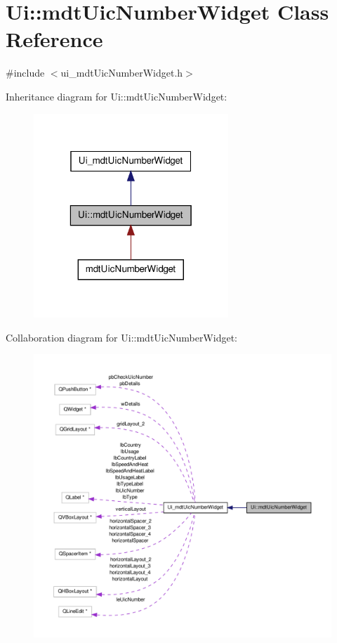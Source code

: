 \hypertarget{class_ui_1_1mdt_uic_number_widget}{\section{Ui\-:\-:mdt\-Uic\-Number\-Widget Class Reference}
\label{class_ui_1_1mdt_uic_number_widget}
}


{\ttfamily \#include $<$ui\-\_\-mdt\-Uic\-Number\-Widget.\-h$>$}



Inheritance diagram for Ui\-:\-:mdt\-Uic\-Number\-Widget\-:
\nopagebreak
\begin{figure}[H]
\begin{center}
\leavevmode
\includegraphics[width=208pt]{class_ui_1_1mdt_uic_number_widget__inherit__graph}
\end{center}
\end{figure}


Collaboration diagram for Ui\-:\-:mdt\-Uic\-Number\-Widget\-:
\nopagebreak
\begin{figure}[H]
\begin{center}
\leavevmode
\includegraphics[width=350pt]{class_ui_1_1mdt_uic_number_widget__coll__graph}
\end{center}
\end{figure}
